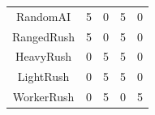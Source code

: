 \documentclass[a0,portrait]{a0poster}
\begin{document}
\begin{multicols}{2}
{\begin{center}
\begin{tabular}{|c|cc|cc|}
				RandomAI              & 5                                      & 0                 & 5                                      & 0                 \\
				RangedRush              & 5                                      & 0                 & 5                                      & 0                 \\
				HeavyRush               & 0                                      & 5                 & 5                                      & 0                 \\
				LightRush               & 0                                      & 5                 & 5                                      & 0                 \\
				WorkerRush              & 0                                      & 5                 & 0                                      & 5                 \\ \hline
		\end{tabular}
	\end{center}
	}

			
\end{multicols}
\end{document}
